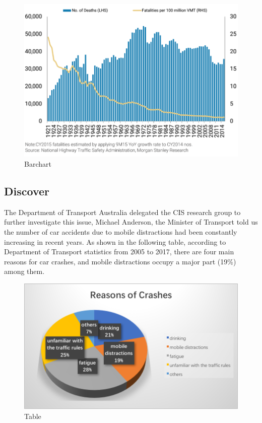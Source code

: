 \documentclass{chi-ext}
\begin{document}
\begin{multicols}{2}
\begin{figure}
\centering
  \includegraphics[width=\columnwidth]{barchart.png}
  \caption{Barchart}
 \label{fig:barchat}
\end{figure}

\subsection{Discover}
The Department of Transport Australia delegated the CIS research group to further investigate this issue, Michael Anderson, the Minister of Transport told us the number of car accidents due to mobile distractions had been constantly increasing in recent years. As shown in the following table, according to Department of Transport statistics from 2005 to 2017, there are four main reasons for car crashes, and mobile distractions occupy a major part (19\%) among them.\\ 

\begin{figure}
\centering
  \includegraphics[width=0.7\columnwidth]{table.png}
  \caption{Table}
 \label{fig:table}
\end{figure}


\end{multicols}
\end{document}
